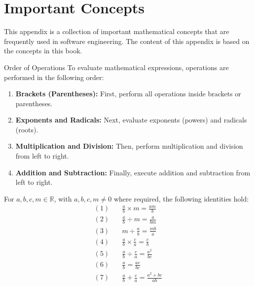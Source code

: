 \chapter{Important Concepts}
\label{chap:ic}

This appendix is a collection of important mathematical concepts that are frequently used in software engineering. 
The content of this appendix is based on the concepts in this book.

\begin{proposition}{Order of Operations}
To evaluate mathematical expressions, operations are performed in the following order:
\begin{enumerate}
    \item \textbf{Brackets (Parentheses):} First, perform all operations inside brackets or parentheses.
    \item \textbf{Exponents and Radicals:} Next, evaluate exponents (powers) and radicals (roots).
    \item \textbf{Multiplication and Division:} Then, perform multiplication and division from left to right.
    \item \textbf{Addition and Subtraction:} Finally, execute addition and subtraction from left to right.
\end{enumerate}
\end{proposition}

\begin{proposition}
For $a,b,c,m \in \mathbb{R}$, with $a,b,c,m \neq 0$ where required, the following identities hold:
\begingroup
\setlength{\jot}{8pt} %
\begin{align*}
(1) & \quad \frac{a}{b} \times m = \frac{am}{b} \\
(2) & \quad \frac{a}{b} \div m = \frac{a}{bm} \\
(3) & \quad m \div \frac{a}{b} = \frac{mb}{a} \\
(4) & \quad \frac{a}{b} \times \frac{c}{a} = \frac{c}{b} \\
(5) & \quad \frac{a}{b} \div \frac{c}{a} = \frac{a^2}{bc} \\
(6) & \quad \frac{a}{b} = \frac{ac}{bc} \\
(7) & \quad \frac{a}{b} + \frac{c}{a} = \frac{a^2 + bc}{ab}
\end{align*}
\endgroup
\end{proposition}

